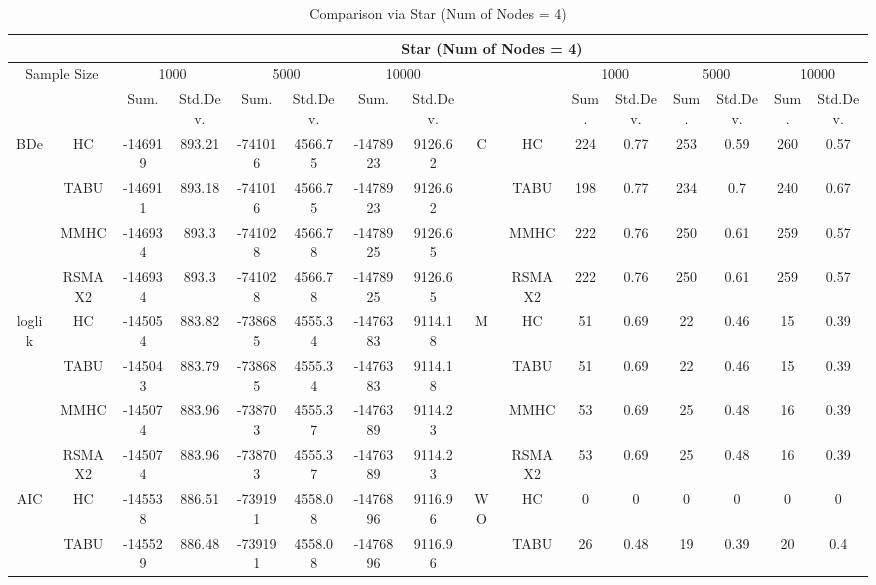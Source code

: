\begin{table}[p]																										
\centering	\caption{Comparison via Star (Num of Nodes = 4)}	\tiny																						
{\tabcolsep=0.01in																										
\begin{tabular}{cc||cc|cc|cc||cc|cc|cc|cc}																										
\hline																										
&	&	\multicolumn{14}{c}{Star	(Num	of	Nodes	=	4)}\tabularnewline																			
\hline																										
\multicolumn{2}{c||}{Sample	Size}	&	\multicolumn{2}{c|}{1000}	&	\multicolumn{2}{c|}{5000}	&	\multicolumn{2}{c||}{10000}	&	&	&	\multicolumn{2}{c|}{1000}	&	\multicolumn{2}{c|}{5000}	&	\multicolumn{2}{c}{10000}\tabularnewline											
\hline																										
&	&	Sum.	&	Std.Dev.	&	Sum.	&	Std.Dev.	&	Sum.	&	Std.Dev.	&	&	&	Sum.	&	Std.Dev.	&	Sum.	&	Std.Dev.	&	Sum.	&	Std.Dev.\tabularnewline
\hline																										
\hline																										
\multirow{4}{*}{BDe} & HC &	-146919 & 	893.21 & 	-741016 & 	4566.75 & 	-1478923 & 	9126.62 & 	\multirow{4}{*}{C} & HC &	224 & 	0.77 & 	253 & 	0.59 & 	260 & 	0.57\tabularnewline													
& TABU &	-146911 & 	893.18 & 	-741016 & 	4566.75 & 	-1478923 & 	9126.62 & 	& TABU &	198 & 	0.77 & 	234 & 	0.7 & 	240 & 	0.67\tabularnewline													
& MMHC &	-146934 & 	893.3 & 	-741028 & 	4566.78 & 	-1478925 & 	9126.65 & 	& MMHC &	222 & 	0.76 & 	250 & 	0.61 & 	259 & 	0.57\tabularnewline													
& RSMAX2 &	-146934 & 	893.3 & 	-741028 & 	4566.78 & 	-1478925 & 	9126.65 & 	& RSMAX2 &	222 & 	0.76 & 	250 & 	0.61 & 	259 & 	0.57\tabularnewline													
\hline																										
\multirow{4}{*}{loglik} & HC &	-145054 & 	883.82 & 	-738685 & 	4555.34 & 	-1476383 & 	9114.18 & 	\multirow{4}{*}{M} & HC &	51 & 	0.69 & 	22 & 	0.46 & 	15 & 	0.39\tabularnewline													
& TABU &	-145043 & 	883.79 & 	-738685 & 	4555.34 & 	-1476383 & 	9114.18 & 	& TABU &	51 & 	0.69 & 	22 & 	0.46 & 	15 & 	0.39\tabularnewline													
& MMHC &	-145074 & 	883.96 & 	-738703 & 	4555.37 & 	-1476389 & 	9114.23 & 	& MMHC &	53 & 	0.69 & 	25 & 	0.48 & 	16 & 	0.39\tabularnewline													
& RSMAX2 &	-145074 & 	883.96 & 	-738703 & 	4555.37 & 	-1476389 & 	9114.23 & 	& RSMAX2 &	53 & 	0.69 & 	25 & 	0.48 & 	16 & 	0.39\tabularnewline													
\hline																										
\multirow{4}{*}{AIC} & HC &	-145538 & 	886.51 & 	-739191 & 	4558.08 & 	-1476896 & 	9116.96 & 	\multirow{4}{*}{WO} & HC &	0 & 	0 & 	0 & 	0 & 	0 & 	0\tabularnewline													
& TABU &	-145529 & 	886.48 & 	-739191 & 	4558.08 & 	-1476896 & 	9116.96 & 	& TABU &	26 & 	0.48 & 	19 & 	0.39 & 	20 & 	0.4\tabularnewline													

\end{tabular}}
\end{table}
